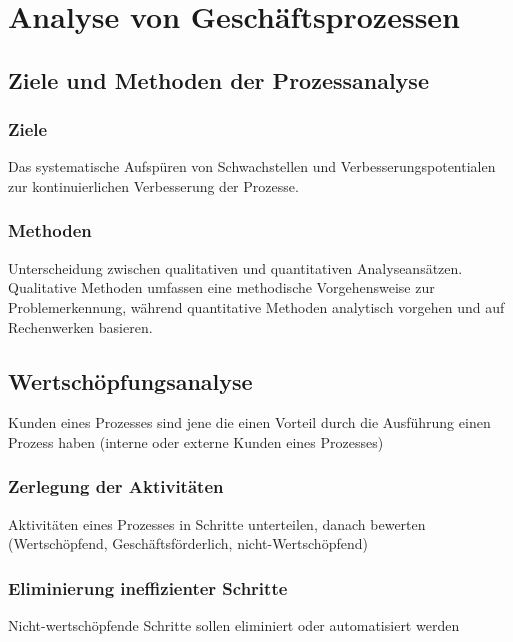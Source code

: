 \section{Analyse von Geschäftsprozessen}

\subsection{Ziele und Methoden der Prozessanalyse}
    \subsubsection*{Ziele}
        Das systematische Aufspüren von Schwachstellen und Verbesserungspotentialen zur kontinuierlichen Verbesserung der Prozesse.
    \subsubsection*{Methoden}
        Unterscheidung zwischen qualitativen und quantitativen Analyseansätzen. Qualitative Methoden umfassen eine methodische Vorgehensweise zur Problemerkennung, während quantitative Methoden analytisch vorgehen und auf Rechenwerken basieren.

\subsection{Wertschöpfungsanalyse}
    Kunden eines Prozesses sind jene die einen Vorteil durch die Ausführung einen Prozess haben (interne oder externe Kunden eines Prozesses)
    \subsubsection*{Zerlegung der Aktivitäten}
        Aktivitäten eines Prozesses in Schritte unterteilen, danach bewerten (Wertschöpfend, Geschäftsförderlich, nicht-Wertschöpfend)
    \subsubsection*{Eliminierung ineffizienter Schritte}
        Nicht-wertschöpfende Schritte sollen eliminiert oder automatisiert werden


